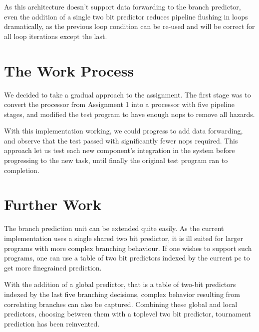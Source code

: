 As this architecture doesn't support data forwarding to the branch predictor, even the addition of a single two bit predictor reduces pipeline flushing in loops dramatically, as the previous loop condition can be re-used and will be correct for all loop iterations except the last.

\section{The Work Process}
We decided to take a gradual approach to the assignment.
The first stage was to convert the processor from Assignment 1 into a processor with five pipeline stages, and modified the test program to have enough nops to remove all hazards.

With this implementation working, we could progress to add data forwarding, and observe that the test passed with significantly fewer nops required.
This approach let us test each new component's integration in the system before progressing to the new task, until finally the original test program ran to completion.

\section{Further Work}

The branch prediction unit can be extended quite easily.
As the current implementation uses a single shared two bit predictor, it is ill suited for larger programs with more complex branching behaviour.
If one wishes to support such programs, one can use a table of two bit predictors indexed by the current pc to get more finegrained prediction.

With the addition of a global predictor, that is a table of two-bit predictors indexed by the last five branching decisions, complex behavior resulting from correlating branches can also be captured.
Combining these global and local predictors, choosing between them with a toplevel two bit predictor, tournament prediction has been reinvented.
